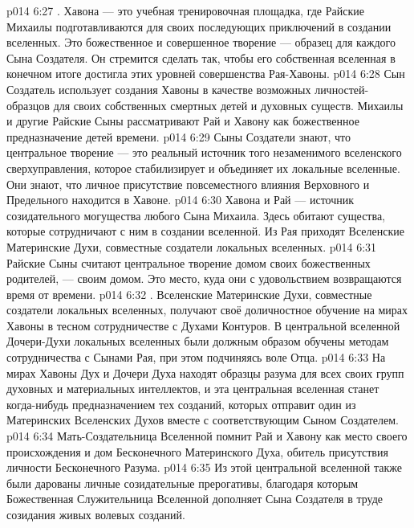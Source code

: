 \vs p014 6:27 . Хавона --- это учебная тренировочная площадка, где Райские Михаилы подготавливаются для своих последующих приключений в создании вселенных. Это божественное и совершенное творение --- образец для каждого Сына Создателя. Он стремится сделать так, чтобы его собственная вселенная в конечном итоге достигла этих уровней совершенства Рая\hyp{}Хавоны.
\vs p014 6:28 Сын Создатель использует создания Хавоны в качестве возможных личностей\hyp{}образцов для своих собственных смертных детей и духовных существ. Михаилы и другие Райские Сыны рассматривают Рай и Хавону как божественное предназначение детей времени.
\vs p014 6:29 Сыны Создатели знают, что центральное творение --- это реальный источник того незаменимого вселенского сверхуправления, которое стабилизирует и объединяет их локальные вселенные. Они знают, что личное присутствие повсеместного влияния Верховного и Предельного находится в Хавоне.
\vs p014 6:30 Хавона и Рай --- источник созидательного могущества любого Сына Михаила. Здесь обитают существа, которые сотрудничают с ним в создании вселенной. Из Рая приходят Вселенские Материнские Духи, совместные создатели локальных вселенных.
\vs p014 6:31 Райские Сыны считают центральное творение домом своих божественных родителей, --- своим домом. Это место, куда они с удовольствием возвращаются время от времени.
\vs p014 6:32 . Вселенские Материнские Духи, совместные создатели локальных вселенных, получают своё доличностное обучение на мирах Хавоны в тесном сотрудничестве с Духами Контуров. В центральной вселенной Дочери\hyp{}Духи локальных вселенных были должным образом обучены методам сотрудничества с Сынами Рая, при этом подчиняясь воле Отца.
\vs p014 6:33 На мирах Хавоны Дух и Дочери Духа находят образцы разума для всех своих групп духовных и материальных интеллектов, и эта центральная вселенная станет когда\hyp{}нибудь предназначением тех созданий, которых отправит один из Материнских Вселенских Духов вместе с соответствующим Сыном Создателем.
\vs p014 6:34 Мать\hyp{}Создательница Вселенной помнит Рай и Хавону как место своего происхождения и дом Бесконечного Материнского Духа, обитель присутствия личности Бесконечного Разума.
\vs p014 6:35 Из этой центральной вселенной также были дарованы личные созидательные прерогативы, благодаря которым Божественная Служительница Вселенной дополняет Сына Создателя в труде созидания живых волевых созданий.
